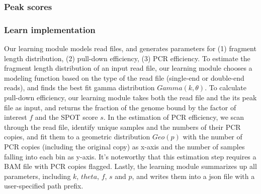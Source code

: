 \documentclass[12pt]{article}
\begin{document}
\subsubsection*{Peak scores}


\subsubsection*{Learn implementation}
Our learning module models read files, and generates parameters for 
(1) fragment length distribution, (2) pull-down efficiency, (3) PCR efficiency.
To estimate the fragment length distribution of an input read file,
our learning module chooses a modeling function based on the type of the read file (single-end or double-end reads),
and finds the best fit gamma distribution $Gamma (k, \theta)$.
To calculate pull-down efficiency, our learning module takes both the read file and the its peak file as input,
and returns the fraction of the genome bound by the factor of interest $f$ and the SPOT score $s$.
In the estimation of PCR efficiency, we scan through the read file, 
identify unique samples and the numbers of their PCR copies,
and fit them to a geometric distribution $Geo(p)$ with the number of PCR copies (including the original copy)
as x-axis and the number of samples falling into each bin as y-axis.
It’s noteworthy that this estimation step requires a BAM file with PCR copies flagged. Lastly, the learning module summarizes up all parameters, including $k$, $theta$, $f$, $s$ and $p$, and writes them into a json file with a user-specified path prefix.
\end{document}
